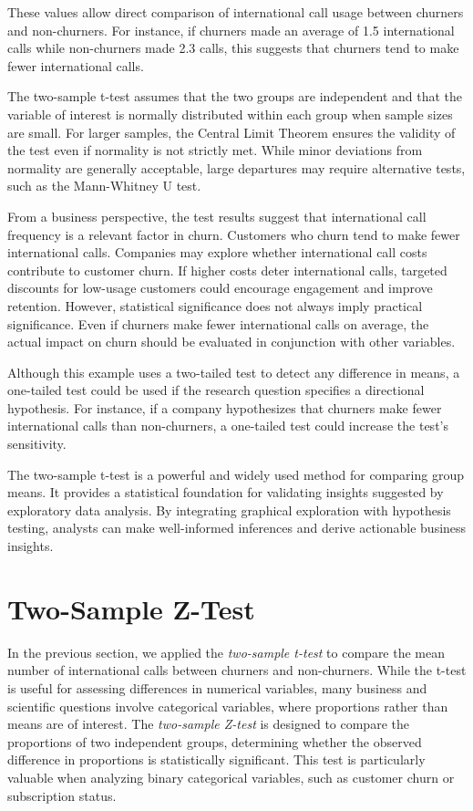 \documentclass[
]{book}
\theoremstyle{definition}
\theoremstyle{definition}
\theoremstyle{definition}
\theoremstyle{definition}
\theoremstyle{remark}
\begin{document}
These values allow direct comparison of international call usage between churners and non-churners. For instance, if churners made an average of 1.5 international calls while non-churners made 2.3 calls, this suggests that churners tend to make fewer international calls.

The two-sample t-test assumes that the two groups are independent and that the variable of interest is normally distributed within each group when sample sizes are small. For larger samples, the Central Limit Theorem ensures the validity of the test even if normality is not strictly met. While minor deviations from normality are generally acceptable, large departures may require alternative tests, such as the Mann-Whitney U test.

From a business perspective, the test results suggest that international call frequency is a relevant factor in churn. Customers who churn tend to make fewer international calls. Companies may explore whether international call costs contribute to customer churn. If higher costs deter international calls, targeted discounts for low-usage customers could encourage engagement and improve retention. However, statistical significance does not always imply practical significance. Even if churners make fewer international calls on average, the actual impact on churn should be evaluated in conjunction with other variables.

Although this example uses a two-tailed test to detect any difference in means, a one-tailed test could be used if the research question specifies a directional hypothesis. For instance, if a company hypothesizes that churners make fewer international calls than non-churners, a one-tailed test could increase the test's sensitivity.

The two-sample t-test is a powerful and widely used method for comparing group means. It provides a statistical foundation for validating insights suggested by exploratory data analysis. By integrating graphical exploration with hypothesis testing, analysts can make well-informed inferences and derive actionable business insights.

\section{Two-Sample Z-Test}\label{two-sample-z-test}

In the previous section, we applied the \emph{two-sample t-test} to compare the mean number of international calls between churners and non-churners. While the t-test is useful for assessing differences in numerical variables, many business and scientific questions involve categorical variables, where proportions rather than means are of interest. The \emph{two-sample Z-test} is designed to compare the proportions of two independent groups, determining whether the observed difference in proportions is statistically significant. This test is particularly valuable when analyzing binary categorical variables, such as customer churn or subscription status.
\end{document}
